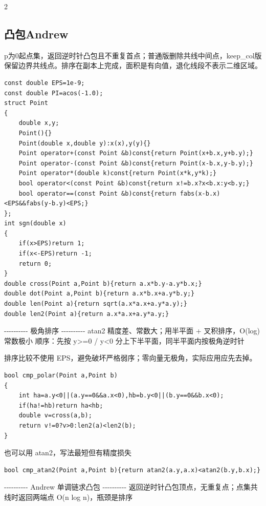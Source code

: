 \documentclass[UTF8,fontset=fandol,a4paper,twoside]{ctexart}
\newcommand{\note}[1]{{\fontsize{10}{12}\selectfont #1\par}}
\begin{document}
\begin{multicols}{2}
\subsection{凸包Andrew}

\note{p为0起点集，返回逆时针凸包且不重复首点；普通版删除共线中间点，keep\_col版保留边界共线点。排序在副本上完成，面积是有向值，退化线段不表示二维区域。}
\begin{lstlisting}
const double EPS=1e-9;
const double PI=acos(-1.0);
struct Point
{
    double x,y;
    Point(){}
    Point(double x,double y):x(x),y(y){}
    Point operator+(const Point &b)const{return Point(x+b.x,y+b.y);}
    Point operator-(const Point &b)const{return Point(x-b.x,y-b.y);}
    Point operator*(double k)const{return Point(x*k,y*k);}
    bool operator<(const Point &b)const{return x!=b.x?x<b.x:y<b.y;}
    bool operator==(const Point &b)const{return fabs(x-b.x)<EPS&&fabs(y-b.y)<EPS;}
};
int sgn(double x)
{
    if(x>EPS)return 1;
    if(x<-EPS)return -1;
    return 0;
}
double cross(Point a,Point b){return a.x*b.y-a.y*b.x;}
double dot(Point a,Point b){return a.x*b.x+a.y*b.y;}
double len(Point a){return sqrt(a.x*a.x+a.y*a.y);}
double len2(Point a){return a.x*a.x+a.y*a.y;}
\end{lstlisting}
\note{-\allowbreak{}-\allowbreak{}-\allowbreak{}-\allowbreak{}-\allowbreak{}-\allowbreak{}-\allowbreak{}-\allowbreak{}-\allowbreak{}-\allowbreak{} 极角排序 -\allowbreak{}-\allowbreak{}-\allowbreak{}-\allowbreak{}-\allowbreak{}-\allowbreak{}-\allowbreak{}-\allowbreak{}-\allowbreak{}-\allowbreak{} atan2 精度差、常数大；用半平面 +\allowbreak{} 叉积排序，O(\allowbreak{}log)\allowbreak{} 常数极小 顺序：先按 y>\allowbreak{}=\allowbreak{}0 /\allowbreak{} y<\allowbreak{}0 分上下半平面，同半平面内按极角逆时针}
\note{排序比较不使用 EPS，避免破坏严格弱序；零向量无极角，实际应用应先去掉。}
\begin{lstlisting}
bool cmp_polar(Point a,Point b)
{
    int ha=a.y<0||(a.y==0&&a.x<0),hb=b.y<0||(b.y==0&&b.x<0);
    if(ha!=hb)return ha<hb;
    double v=cross(a,b);
    return v!=0?v>0:len2(a)<len2(b);
}
\end{lstlisting}
\note{也可以用 atan2，写法最短但有精度损失}
\begin{lstlisting}
bool cmp_atan2(Point a,Point b){return atan2(a.y,a.x)<atan2(b.y,b.x);}
\end{lstlisting}
\note{-\allowbreak{}-\allowbreak{}-\allowbreak{}-\allowbreak{}-\allowbreak{}-\allowbreak{}-\allowbreak{}-\allowbreak{}-\allowbreak{}-\allowbreak{} Andrew 单调链求凸包 -\allowbreak{}-\allowbreak{}-\allowbreak{}-\allowbreak{}-\allowbreak{}-\allowbreak{}-\allowbreak{}-\allowbreak{}-\allowbreak{}-\allowbreak{} 返回逆时针凸包顶点，无重复点；点集共线时返回两端点 O(\allowbreak{}n log n)\allowbreak{}，瓶颈是排序}

\end{multicols}
\end{document}
